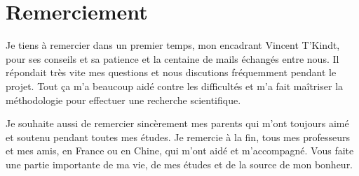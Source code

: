 \chapter*{Remerciement}
Je tiens à remercier dans un premier temps, mon encadrant Vincent T'Kindt, pour ses conseils et sa patience et la centaine de mails échangés entre nous. Il répondait très vite mes questions et nous discutions fréquemment pendant le projet. Tout ça m'a beaucoup aidé contre les difficultés et m'a fait maîtriser la méthodologie pour effectuer une recherche scientifique.

Je souhaite aussi de remercier sincèrement mes parents qui m'ont toujours aimé et soutenu pendant toutes mes études. Je remercie à la fin, tous mes professeurs et mes amis, en France ou en Chine, qui m'ont aidé et m'accompagné. Vous faite une partie importante de ma vie, de mes études et de la source de mon bonheur.
